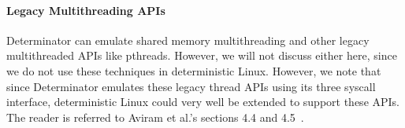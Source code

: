 \paragraph{Legacy Multithreading APIs}
Determinator can emulate shared memory multithreading and other legacy
multithreaded APIs like pthreads. However, we will not discuss either here,
since we do not use these techniques in deterministic Linux. However, we note
that since Determinator emulates these legacy thread APIs using its three
syscall interface, deterministic Linux could very well be extended to support
these APIs. The reader is referred to Aviram et al.'s sections 4.4 and
4.5~\cite{Aviram10}.

\endinput

